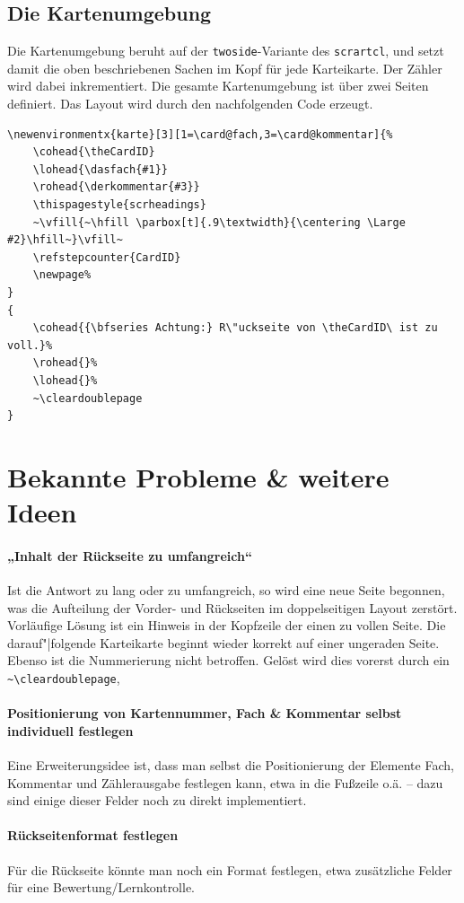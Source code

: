 \documentclass[a4paper,DIV=calc]{scrartcl}
\begin{document}
\subsection{Die Kartenumgebung}
Die Kartenumgebung beruht auf der \lstinline!twoside!-Variante des \lstinline!scrartcl!, und setzt damit die oben beschriebenen Sachen im Kopf für jede Karteikarte. Der Zähler wird dabei inkrementiert. Die gesamte Kartenumgebung ist über zwei Seiten definiert. Das Layout wird durch den nachfolgenden Code erzeugt.
\begin{lstlisting}[title=Die Kartenumgebung,float=h]
\newenvironmentx{karte}[3][1=\card@fach,3=\card@kommentar]{%
	\cohead{\theCardID}
	\lohead{\dasfach{#1}}
	\rohead{\derkommentar{#3}}
	\thispagestyle{scrheadings}
	~\vfill{~\hfill \parbox[t]{.9\textwidth}{\centering \Large #2}\hfill~}\vfill~
	\refstepcounter{CardID}
	\newpage%
}
{
	\cohead{{\bfseries Achtung:} R\"uckseite von \theCardID\ ist zu voll.}%
	\rohead{}%
	\lohead{}%
	~\cleardoublepage
}
\end{lstlisting}
%
%
%
\section{Bekannte Probleme \& weitere Ideen}
\paragraph{„Inhalt der Rückseite zu umfangreich“} %
Ist die Antwort zu lang oder zu umfangreich, so wird eine neue Seite begonnen, was die Aufteilung der Vorder- und Rückseiten im doppelseitigen Layout zerstört. Vorläufige Lösung ist ein Hinweis in der Kopfzeile der einen zu vollen Seite. Die darauf"|folgende Karteikarte beginnt wieder korrekt auf einer ungeraden Seite. Ebenso ist die Nummerierung nicht betroffen. Gelöst wird dies vorerst durch ein \lstinline!~\cleardoublepage!, 

\paragraph{Positionierung von Kartennummer, Fach \& Kommentar selbst individuell festlegen}
Eine Erweiterungsidee ist, dass man selbst die Positionierung der Elemente Fach, Kommentar und Zählerausgabe festlegen kann, etwa in die Fußzeile o.ä. -- dazu sind einige dieser Felder noch zu direkt implementiert.

\paragraph{Rückseitenformat festlegen} 
Für die Rückseite könnte man noch ein Format festlegen, etwa zusätzliche Felder für eine Bewertung/Lernkontrolle.
\end{document}
